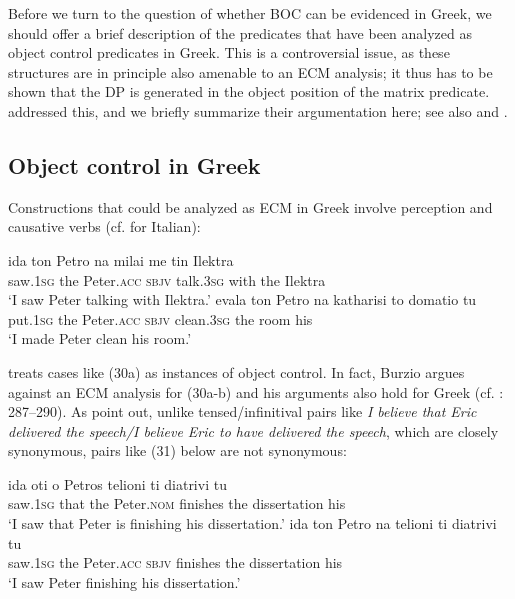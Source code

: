 \documentclass[output=paper]{langsci/langscibook}
\begin{document}
Before we turn to the question of whether BOC can be evidenced in Greek, we should offer a brief description of the predicates that have been analyzed as object control predicates in Greek. This is a controversial issue, as these structures are in principle also amenable to an ECM analysis; it thus has to be shown that the DP is generated in the object position of the matrix predicate. \citet{Alexiadou1997} addressed this, and we briefly summarize their argumentation here; see also \citet{Kotzoglou2002} and \citet{Kotzoglou2007}. 

\subsection{Object control in Greek}%
Constructions that could be analyzed as ECM in Greek involve perception and causative verbs (cf. \citealt{Burzio1986} for Italian):


\ea%
    \label{ex:alexiadou:35}
    \ea \gll ida          ton  Petro         na    milai     me   tin Ilektra\\
             saw{}.\textsc{1sg}  the   Peter{}.\textsc{acc}  \textsc{sbjv} talk.\textsc{3sg} with  the Ilektra\\
    \glt     ‘I saw Peter talking with Ilektra.’
    \ex
    \gll evala      ton Petro       na     katharisi   to   domatio tu\\ 
             put{}.\textsc{1sg}  the Peter{}.\textsc{acc} \textsc{sbjv}   clean.\textsc{3sg}  the  room     his\\
    \glt     ‘I made Peter clean his room.’
    \z
\z    

\citet{Iatridou1993} treats cases like (30a) as instances of object control. In fact, Burzio argues against an ECM analysis for (30a-b) and his arguments also hold for Greek (cf. \citealt{Burzio1986}: 287--290). As \citet{Alexiadou1997} point out, unlike tensed\slash infinitival pairs like \textit{I believe that Eric delivered the speech\slash I believe Eric to have delivered the speech}, which are closely synonymous, pairs like (31) below are not synonymous:

\ea%
    \label{ex:alexiadou:36}
    \ea
    \gll ida          oti   o    Petros         telioni   ti      diatrivi       tu\\
             saw{}.\textsc{1sg}  that  the Peter{}.\textsc{nom}   finishes  the  dissertation his\\
    \glt     ‘I saw that Peter is finishing his dissertation.’
    \ex
    \gll ida          ton  Petro      na     telioni   ti    diatrivi        tu\\
             saw{}.\textsc{1sg}  the  Peter{}.\textsc{acc} \textsc{sbjv} finishes the  dissertation his\\
    \glt     ‘I saw Peter finishing his dissertation.’
    \z
\z
\end{document}
